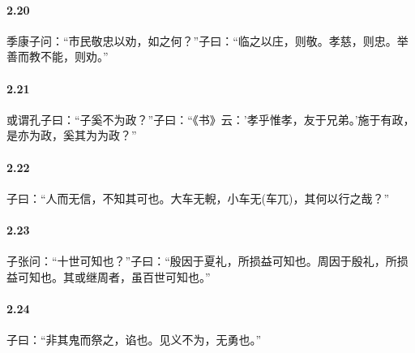 \documentclass[main.tex]{subfiles}
\begin{document}
\paragraph{2.20}
季康子问：“市民敬忠以劝，如之何？”子曰：“临之以庄，则敬。孝慈，则忠。举善而教不能，则劝。”

\paragraph{2.21}
或谓孔子曰：“子奚不为政？”子曰：“《书》云：’孝乎惟孝，友于兄弟。’施于有政，是亦为政，奚其为为政？”

\paragraph{2.22}
子曰：“人而无信，不知其可也。大车无輗，小车无(车兀)，其何以行之哉？”

\paragraph{2.23}
子张问：“十世可知也？”子曰：“殷因于夏礼，所损益可知也。周因于殷礼，所损益可知也。其或继周者，虽百世可知也。”

\paragraph{2.24}
子曰：“非其鬼而祭之，谄也。见义不为，无勇也。”
\end{document}
